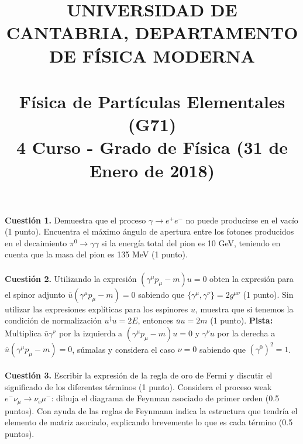 \documentclass[paper=a4, fontsize=11pt]{scrartcl} %
\date{}
\title{	
\normalfont \normalsize 
\textsc{UNIVERSIDAD DE CANTABRIA, DEPARTAMENTO DE FÍSICA MODERNA} \\ [20pt] %
\horrule{0.5pt} \\[0.4cm] %
\huge Física de Partículas Elementales (G71) \\ %
\normalsize 4 Curso - Grado de Física (31 de Enero de 2018)
\horrule{2pt} \\[0.5cm] %
}
\numberwithin{equation}{section} %
\numberwithin{figure}{section} %
\numberwithin{table}{section} %
\begin{document}
\maketitle %

\vspace{-2.5cm}

\textbf{Cuestión 1.} Demuestra que el proceso $\gamma \rightarrow e^{+}e^{-}$ no puede producirse en el vacío (1 punto). Encuentra el máximo ángulo de apertura entre los fotones producidos en el decaimiento
$\pi^{0}\rightarrow\gamma\gamma$ si la energía total del pion es 10 GeV, teniendo en cuenta que la masa del pion es 135 MeV (1 punto). 
\\
\\
\textbf{Cuestión 2.} Utilizando la expresión $(\gamma^\mu p_\mu - m)u = 0$ obten la expresión para el spinor adjunto $\bar{u}(\gamma^\mu p_\mu - m) = 0$ sabiendo que $\{\gamma^\mu, \gamma^\nu\}=2g^{\mu\nu}$ (1 punto). 
Sin utilizar las expresiones explíticas para los espinores $u$, muestra que si tenemos la condición de normalización $u^\dag u=2E$, entonces $\bar{u}u = 2m$ (1 punto). \textbf{Pista:} Multiplica $\bar{u}\gamma^\nu$ por la
izquierda a $(\gamma^\mu p_\mu - m)u = 0$ y $\gamma^\nu u$ por la derecha a $\bar{u}(\gamma^\mu p_\mu - m) = 0$, súmalas y considera el caso $\nu=0$ sabiendo que $(\gamma^0)^2=1$.
\\
\\
\textbf{Cuestión 3.} Escribir la expresión de la regla de oro de Fermi y discutir el significado de los diferentes términos (1 punto). Considera el proceso weak $e^{-}\nu_\mu\rightarrow\nu_e\mu^{-}$: dibuja
el diagrama de Feynman asociado de primer orden (0.5 puntos). Con ayuda de las reglas de Feynmann indica la estructura que tendría el elemento de matriz asociado, explicando brevemente lo que es cada término (0.5 puntos).  
\end{document}
